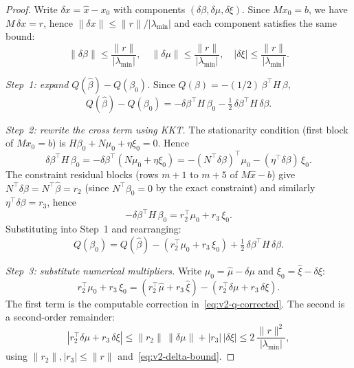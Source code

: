 \begin{proof}
Write $\delta x = \hat x - x_0$ with components
$(\delta\beta, \delta\mu, \delta\xi)$.
Since $M x_0 = b$, we have $M\,\delta x = r$,
hence $\|\delta x\| \leq \|r\| / |\lambda_{\min}|$ and
each component satisfies the same bound:
\begin{equation}\label{eq:v2-delta-bound}
  \|\delta\beta\| \leq \frac{\|r\|}{|\lambda_{\min}|}, \quad
  \|\delta\mu\| \leq \frac{\|r\|}{|\lambda_{\min}|}, \quad
  |\delta\xi| \leq \frac{\|r\|}{|\lambda_{\min}|}.
\end{equation}

\emph{Step~1: expand $Q(\hat\beta) - Q(\beta_0)$.}
Since $Q(\beta) = -(1/2)\,\beta^\top H\,\beta$,
\[
  Q(\hat\beta) - Q(\beta_0)
  = -\delta\beta^\top H\,\beta_0
    - \tfrac{1}{2}\,\delta\beta^\top H\,\delta\beta.
\]

\emph{Step~2: rewrite the cross term using KKT.}
The stationarity condition (first block of $M x_0 = b$) is
$H\beta_0 + N\mu_0 + \eta\xi_0 = 0$.
Hence
\[
  \delta\beta^\top H\,\beta_0
  = -\delta\beta^\top(N\mu_0 + \eta\xi_0)
  = -(N^\top\delta\beta)^\top \mu_0
    - (\eta^\top\delta\beta)\,\xi_0.
\]
The constraint residual blocks
(rows $m{+}1$ to $m{+}5$ of $M\hat x - b$) give
$N^\top\delta\beta = N^\top\hat\beta = r_2$
(since $N^\top\beta_0 = 0$ by the exact constraint)
and similarly $\eta^\top\delta\beta = r_3$, hence
\begin{equation}\label{eq:v2-cross-term}
  -\delta\beta^\top H\,\beta_0
  = r_2^\top\mu_0 + r_3\,\xi_0.
\end{equation}
Substituting into Step~1 and rearranging:
\begin{equation}\label{eq:v2-q-expansion}
  Q(\beta_0) = Q(\hat\beta) - (r_2^\top\mu_0 + r_3\,\xi_0)
    + \tfrac{1}{2}\,\delta\beta^\top H\,\delta\beta.
\end{equation}

\emph{Step~3: substitute numerical multipliers.}
Write $\mu_0 = \hat\mu - \delta\mu$ and
$\xi_0 = \hat\xi - \delta\xi$:
\[
  r_2^\top\mu_0 + r_3\,\xi_0
  = (r_2^\top\hat\mu + r_3\,\hat\xi)
    - (r_2^\top\delta\mu + r_3\,\delta\xi).
\]
The first term is the computable correction
in~\eqref{eq:v2-q-corrected}.
The second is a second-order remainder:
\begin{equation}\label{eq:v2-substitution-remainder}
  |r_2^\top\delta\mu + r_3\,\delta\xi|
  \leq \|r_2\|\,\|\delta\mu\| + |r_3|\,|\delta\xi|
  \leq 2\,\frac{\|r\|^2}{|\lambda_{\min}|},
\end{equation}
using $\|r_2\|, |r_3| \leq \|r\|$
and~\eqref{eq:v2-delta-bound}.


\end{proof}
